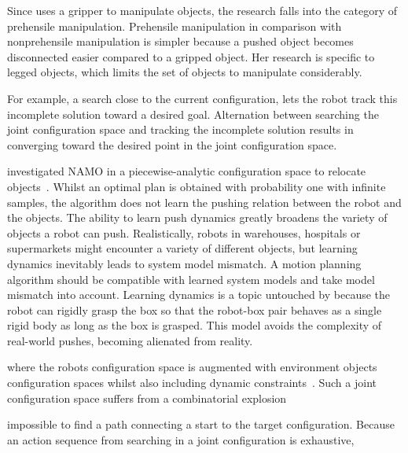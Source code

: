 Since \citeauthor{sabbaghnovin_model_2021} uses a gripper to manipulate objects, the research falls into the category of prehensile manipulation. Prehensile manipulation in comparison with nonprehensile manipulation is simpler because a pushed object becomes disconnected easier compared to a gripped object. Her research is specific to legged objects, which limits the set of objects to manipulate considerably.\bs

 For example, a search close to the current configuration, lets the robot track this incomplete solution toward a desired goal. Alternation between searching the joint configuration space and tracking the incomplete solution results in converging toward the desired point in the joint configuration space.

\citeauthor{vega-brown_asymptotically_2020} investigated \ac{NAMO} in a piecewise-analytic configuration space to relocate objects~\cite{vega-brown_asymptotically_2020}. Whilst an optimal plan is obtained with probability one with infinite samples, the algorithm does not learn the pushing relation between the robot and the objects. The ability to learn push dynamics greatly broadens the variety of objects a robot can push. Realistically, robots in warehouses, hospitals or supermarkets might encounter a variety of different objects, but learning dynamics inevitably leads to system model mismatch. A motion planning algorithm should be compatible with learned system models and take model mismatch into account. Learning dynamics is a topic untouched by \citeauthor{vega-brown_asymptotically_2020} because the robot can rigidly grasp the box so that the robot-box pair behaves as a single rigid body as long as the box is grasped. This model avoids the complexity of real-world pushes, becoming alienated from reality.\bs




 where the robots configuration space is augmented with environment objects configuration spaces whilst also including dynamic constraints~\cite{hauser_multimodal_2010,berenson_manipulation_2009,jaillet_path_2013}. Such a joint configuration space suffers from a combinatorial explosion

impossible to find a path connecting a start to the target configuration. Because an action sequence from searching in a joint configuration is exhaustive,




